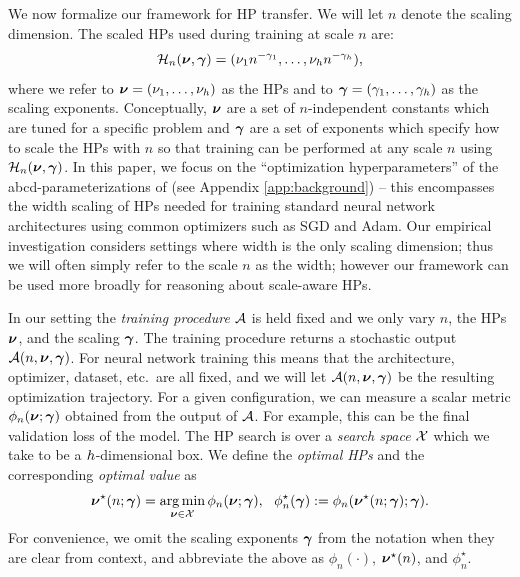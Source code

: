 We now formalize our framework for HP transfer. We will let $n$ denote the scaling dimension. The scaled HPs used during training at scale $n$ are:
\[
    \mathcal{H}_n(\bm{\nu}, \bm{\gamma}) = (\nu_1 n^{-\gamma_1}, \ldots, \nu_{h} n^{-\gamma_{h}}),
\]
where we refer to $\bm{\nu} = (\nu_1, \ldots, \nu_{h})$ as the HPs and to $\bm{\gamma} = (\gamma_1, \ldots, \gamma_{h})$ as the scaling exponents. Conceptually, $\bm{\nu}$ are a set of $n$-independent constants which are tuned for a specific problem and $\bm{\gamma}$ are a set of exponents which specify how to scale the HPs with $n$ so that training can be performed at any scale $n$ using $\mathcal{H}_n(\bm{\nu}, \bm{\gamma})$. 
In this paper, we focus on the ``optimization hyperparameters'' of the abcd-parameterizations of \citet{yang2023tensor} (see Appendix \ref{app:background}) -- this encompasses the width scaling of HPs needed for training standard neural network architectures using common optimizers such as SGD and Adam.
Our empirical investigation considers settings where width is the only scaling dimension; thus we will often simply refer to the scale $n$ as the width; however our framework can be used more broadly for reasoning about scale-aware HPs.

In our setting the \emph{training procedure} $\mathcal{A}$ is held fixed and we only vary $n$, the HPs $\bm{\nu}$, and the scaling $\bm{\gamma}$. The training procedure returns a stochastic output $\mathcal{A}(n, \bm{\nu}, \bm{\gamma})$. For neural network training this means that the architecture, optimizer, dataset, etc.\ are all fixed, and we will let $\mathcal{A}(n, \bm{\nu}, \bm{\gamma})$ be the resulting optimization trajectory. For a given configuration, we can measure a scalar metric $\phi_n(\bm{\nu}; \bm{\gamma})$ obtained from the output of $\mathcal{A}$. For example, this can be the final validation loss of the model. The HP search is over a \emph{search space} $\mathcal{X}$ which we take to be a $h$-dimensional box. 
We define the \emph{optimal HPs} and the corresponding \emph{optimal value} as
\[
    \bm{\nu}^\star(n; \bm{\gamma}) = \operatorname*{arg\,min}_{\bm{\nu} \in \mathcal{X}} \phi_n(\bm{\nu}; \bm{\gamma}),~~ \phi_n^\star(\bm{\gamma}) := \phi_n(\bm{\nu}^\star(n; \bm{\gamma}); \bm{\gamma}).
\]
For convenience, we omit the scaling exponents $\bm{\gamma}$ from the notation when they are clear from context, and abbreviate the above as $\phi_n(\cdot)$, $\bm{\nu}^\star(n)$, and $\phi_n^\star$.  
 
